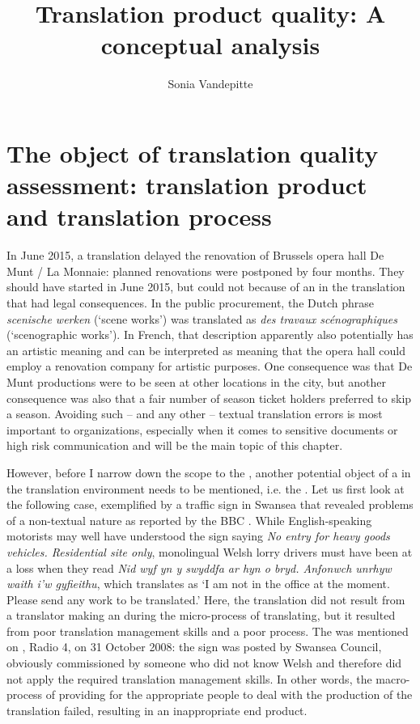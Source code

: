 \documentclass[output=paper]{langsci/langscibook}
\author{Sonia Vandepitte\affiliation{Ghent University}}
\title{Translation product quality: \newlineCover A conceptual analysis}
\begin{document}
\section{The object of translation quality assessment: translation product and translation process}\label{sec:vandepitte:1}

In June 2015, a translation  delayed the renovation of Brussels opera hall De Munt / La Monnaie: planned renovations were postponed by four months. They should have started in June 2015, but could not because of an  in the translation that had legal consequences. In the public procurement, the Dutch phrase \textit{scenische werken} (`scene works') was translated as \textit{des travaux scénographiques} (`scenographic works'). In French, that description apparently also potentially has an artistic meaning and can be interpreted as meaning that the opera hall could employ a renovation company for artistic purposes. One consequence was that De Munt productions were to be seen at other locations in the city, but another consequence was also that a fair number of season ticket holders preferred to skip a season. Avoiding such – and any other – textual translation errors is most important to organizations, especially when it comes to sensitive documents or high risk communication and will be the main topic of this chapter. 


However, before I narrow down the scope to the , another potential object of a  in the translation environment needs to be mentioned, i.e. the . Let us first look at the following case, exemplified by a traffic sign in Swansea that revealed problems of a non-textual nature as reported by the BBC \citep{BBCNews2008}. While English-speaking motorists may well have understood the sign saying \textit{No entry for heavy goods vehicles. Residential site only}, monolingual Welsh lorry drivers must have been at a loss when they read \textit{Nid wyf yn y swyddfa ar hyn o bryd. Anfonwch unrhyw waith i'w gyfieithu}, which translates as `I am not in the office at the moment. Please send any work to be translated.' Here, the translation  did not result from a translator making an  during the micro-process of translating, but it resulted from poor translation management skills and a poor  process. The  was mentioned on \citeauthor{BBCNews2008}, Radio 4, on 31 October 2008: the sign was posted by Swansea Council, obviously commissioned by someone who did not know Welsh and therefore did not apply the required translation management skills. In other words, the macro-process of providing for the appropriate people to deal with the production of the translation failed, resulting in an inappropriate end product.
\end{document}
